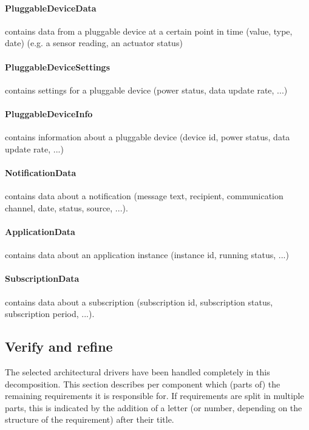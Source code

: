     \paragraph{PluggableDeviceData}
              contains data from a pluggable device at a certain point in time
              (value, type, date) (e.g. a sensor reading, an actuator status)
    \paragraph{PluggableDeviceSettings}
              contains settings for a pluggable device (power status,
              data update rate, ...)
    \paragraph{PluggableDeviceInfo}
              contains information about a pluggable device (device id,
              power status, data update rate, ...)
    \paragraph{NotificationData}
              contains data about a notification (message text, recipient,
              communication channel, date, status, source, ...).
    \paragraph{ApplicationData}
              contains data about an application instance (instance id, running status, ...)
    \paragraph{SubscriptionData}
              contains data about a subscription (subscription id, subscription status,
              subscription period, ...).


\subsection{Verify and refine}
    \noindent The selected architectural drivers have been handled completely
    in this decomposition.
    This section describes per component which (parts of) the remaining
    requirements it is responsible for. If requirements are split in
    multiple parts, this is indicated by the addition of a letter
    (or number, depending on the structure of the requirement) after their title.


